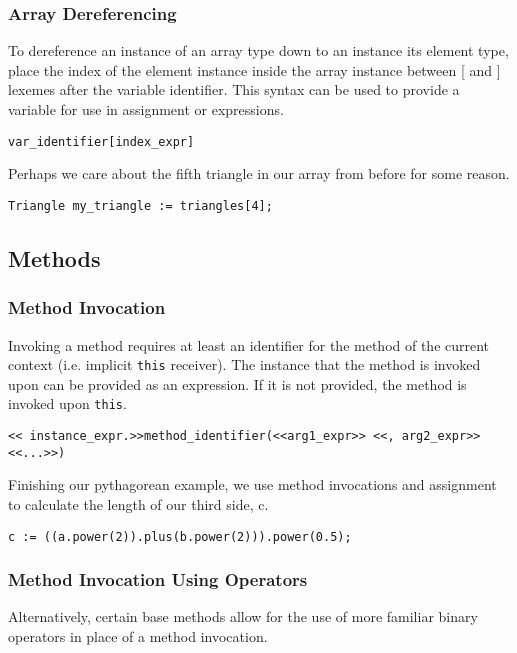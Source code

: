 \subsubsection{Array Dereferencing}
To dereference an instance of an array type down to an instance its element type, place the index of the element instance inside the array instance between [ and ] lexemes after the variable identifier. This syntax can be used to provide a variable for use in assignment or expressions.

\begin{lstlisting}
var_identifier[index_expr]
\end{lstlisting}

Perhaps we care about the fifth triangle in our array from before for some reason.

\begin{lstlisting}[caption=Array Dereferencing a Triangle, backgroundcolor=\color{tintedorange}]
Triangle my_triangle := triangles[4];
\end{lstlisting}


\subsection{Methods}
\subsubsection{Method Invocation}
Invoking a method requires at least an identifier for the method of the current context (i.e. implicit \verb!this! receiver). The instance that the method is invoked upon can be provided as an expression. If it is not provided, the method is invoked upon \verb!this!.

\begin{lstlisting}
<< instance_expr.>>method_identifier(<<arg1_expr>> <<, arg2_expr>> <<...>>)
\end{lstlisting}

Finishing our pythagorean example, we use method invocations and assignment to calculate the length of our third side, c.

\begin{lstlisting}[backgroundcolor=\color{tintedorange},caption=Method Invocation for the Pythagorean Theorem Using Methods]
c := ((a.power(2)).plus(b.power(2))).power(0.5);
\end{lstlisting}

\subsubsection{Method Invocation Using Operators}
Alternatively, certain base methods allow for the use of more familiar binary operators in place of a method invocation.

